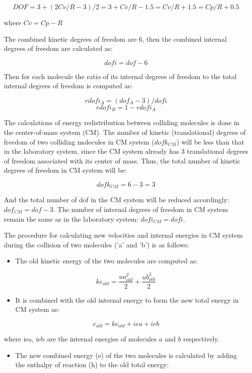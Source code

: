 \[ DOF = 3 + (2Cv/R-3)/2 = 3 + Cv/R - 1.5 = Cv/R + 1.5 = Cp/R + 0.5 \]

where $Cv = Cp - R$

The combined kinetic degrees of freedom are 6, then the combined internal degrees of freedom are calculated as:

\[dofi = dof-6 \]

Then for each molecule the ratio of its internal degrees of freedom to the total internal degrees of freedom is computed as:

\[ rdofi_A = (dof_A - 3)/dofi \] \[ rdofi_B = 1 - rdofi_A \]

The calculations of energy redistribution between colliding molecules is done in the center-of-mass system (CM). The number of kinetic (translational) degrees of freedom of two colliding molecules in CM system ($dofk_{CM}$) will be less than that in the laboratory system, since the CM system already has 3 translational degrees of freedom associated with its center of mass. Thus, the total number of kinetic degrees of freedom in CM system will be:

\[ dofk_{CM} = 6 - 3 = 3 \]

And the total number of dof in the CM system will be reduced accordingly: $dof_{CM} = dof - 3$. The number of internal degrees of freedom in CM system remain the same as in the laboratory system: $dofi_{CM} = dofi$.

The procedure for calculating new velocities and internal energies in CM system during the collision of two molecules ('a' and 'b') is as follows:

\begin{itemize}
\item The old kinetic energy of the two molecules are computed as:\end{itemize}


\[ ke_{old} = \frac{ua_{old}^2}{2} + \frac{ub_{old}^2}{2} \]

\begin{itemize}
\item It is combined with the old internal energy to form the new total energy in CM system as:\end{itemize}


\[ e_{old} = ke_{old} + iea + ieb \]

where iea, ieb are the internal energies of molecules $a$ and $b$ respectively.

\begin{itemize}
\item The new combined energy (e) of the two molecules is calculated by adding the enthalpy of reaction (h) to the old total energy:\end{itemize}


